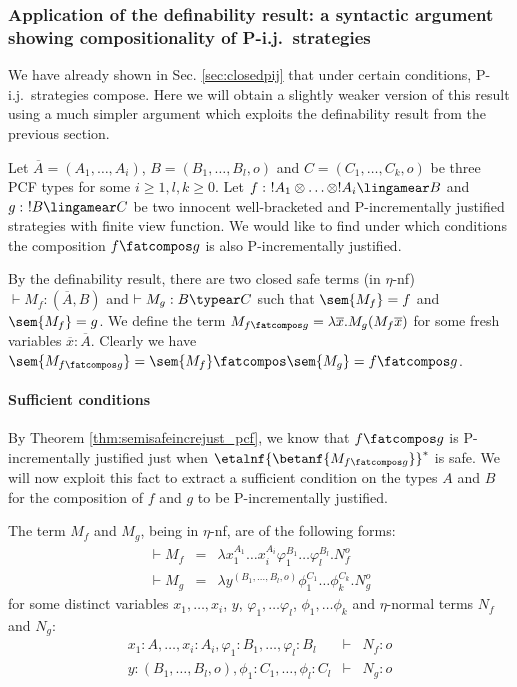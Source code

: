 \subsubsection{Application of the definability result: a syntactic
argument showing compositionality of P-i.j.\ strategies}


We have already shown in Sec. \ref{sec:closedpij} that under certain
conditions, P-i.j.\ strategies compose. Here we will obtain a
slightly weaker version of this result using a much simpler argument
which exploits the definability result from the previous section.


 Let $\overline{A} = (A_1, \ldots, A_i)$, $B = (B_1, \ldots,
B_l,o)$ and $C=(C_1,\ldots,C_k,o)$ be three PCF types for some
$i\geq 1,l,k\geq 0$. Let $f:\ !A_1 \otimes \ldots \otimes !A_i
\lingamear B$ and $g:\ !B\lingamear C$ be two innocent
well-bracketed and P-incrementally justified strategies with finite
view function. We would like to find under which conditions the
composition $f\fatcompos g$ is also P-incrementally justified.

By the definability result, there are two closed safe terms (in $\eta$-nf) $\vdash M_f :(\overline{A},B)$  and $\vdash M_g :B \typear C$ such that $\sem{M_f} = f$
and $\sem{M_f} = g$.
We define the term $M_{f\fatcompos g} = \lambda \overline{x} . M_g (M_f \overline{x})$ for some fresh variables $\overline{x} : \overline{A}$. Clearly we have $\sem{M_{f\fatcompos g}} = \sem{M_f} \fatcompos \sem{M_g} = f\fatcompos g$.

\paragraph{Sufficient conditions}

By Theorem \ref{thm:semisafeincrejust_pcf}, we know that
$f\fatcompos g$ is P-incrementally justified just when
$\etalnf{\betanf{M_{f\fatcompos g}}}^*$ is safe. We will now exploit
this fact to extract a sufficient condition on the types $A$ and $B$
for the composition of $f$ and $g$ to be P-incrementally justified.

The term $M_f$ and $M_g$, being in $\eta$-nf, are of the following forms:
\begin{eqnarray*}
\vdash M_f &=& \lambda x_1^{A_1} \ldots x_i^{A_i} \varphi_1^{B_1} \ldots \varphi_l^{B_l} . N_f^o\\
\vdash  M_g &=& \lambda y^{ (B_1, \ldots, B_l,o)} \phi_1^{C_1} \ldots \phi_k^{C_k} . N_g^o
\end{eqnarray*}
for some distinct variables $x_1, \ldots, x_i$, $y$, $\varphi_1, \dots \varphi_l$, $\phi_1, \dots \phi_k$  and $\eta$-normal terms $N_f$ and $N_g$:
\begin{eqnarray*}
x_1:A, \ldots, x_i:A_i, \varphi_1:B_1, \dots, \varphi_l:B_l &\vdash& N_f :o \\
y: (B_1, \ldots, B_l,o), \phi_1:C_1, \dots, \phi_l:C_l &\vdash& N_g :o
\end{eqnarray*}



